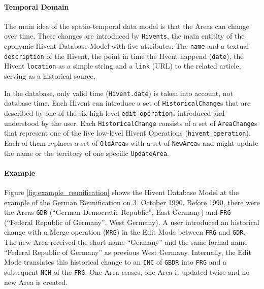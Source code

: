 
\paragraph{Temporal Domain} %
\label{par:temporal_domain}

The main idea of the spatio-temporal data model is that the Areas can change over time. These changes are introduced by \texttt{Hivents}, the main entitity of the eponymic Hivent Database Model with five attributes: The \texttt{name} and a textual \texttt{description} of the Hivent, the point in time the Hvent happend (\texttt{date}), the Hivent \texttt{location} as a simple string and a \texttt{link} (URL) to the related article, serving as a historical source.

In the database, only valid time (\texttt{Hivent.date}) is taken into account, not database time. Each Hivent can introduce a set of \texttt{HistoricalChange}s that are described by one of the six high-level \texttt{edit\_operation}s introduced and understood by the user. Each \texttt{HistoricalChange} consists of a set of \texttt{AreaChange}s that represent one of the five low-level Hivent Operations (\texttt{hivent\_operation}). Each of them replaces a set of \texttt{OldArea}s with a set of \texttt{NewArea}s and might update the name or the territory of one specific \texttt{UpdateArea}.


\paragraph{Example} %
\label{par:example}

Figure \ref{fig:example_reunification} shows the Hivent Database Model at the example of the German Reunification on 3. October 1990. Before 1990, there were the Areas \texttt{GDR} (``German Democratic Republic'', East Germany) and \texttt{FRG} (``Federal Republic of Germany'', West Germany). A user introduced an historical change with a Merge operation (\texttt{MRG}) in the Edit Mode between \texttt{FRG} and \texttt{GDR}. The new Area received the short name ``Germany'' and the same formal name ``Federal Republic of Germany'' as previous West Germany. Internally, the Edit Mode translates this historical change to an \texttt{INC} of \texttt{GBDR} into \texttt{FRG} and a subsequent \texttt{NCH} of the \texttt{FRG}. One Area ceases, one Area is updated twice and no new Area is created.

